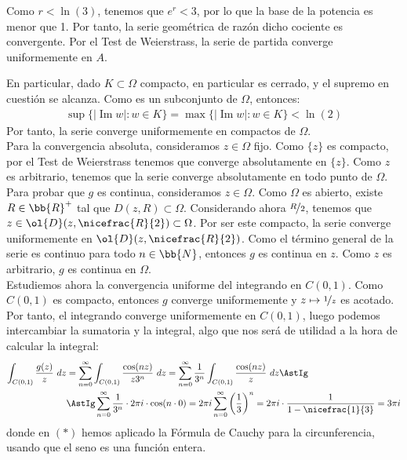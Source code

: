 \documentclass[12pt]{article}
\renewcommand{\Im}{\operatorname{Im}}
\begin{document}
\begin{ejercicio}[4 puntos]
\begin{description}
            Como $r<\ln(3)$, tenemos que $e^{r}<3$, por lo que la base de la potencia es menor que 1. Por tanto, la serie geométrica de razón dicho cociente es convergente. Por el Test de Weierstrass, la serie de partida converge uniformemente en $A$.
        \end{description}

        En particular, dado $K\subset \Omega$ compacto, en particular es cerrado, y el supremo en cuestión se alcanza. Como es un subconjunto de $\Omega$, entonces:
        \begin{align*}
            \sup\{|\Im w| : w\in K\}=\max\{|\Im w| : w\in K\} < \ln(2)
        \end{align*}
        Por tanto, la serie converge uniformemente en compactos de $\Omega$.\\

        Para la convergencia absoluta, consideramos $z\in \Omega$ fijo. Como $\{z\}$ es compacto, por el Test de Weierstrass tenemos que converge absolutamente en $\{z\}$. Como $z$ es arbitrario, tenemos que la serie converge absolutamente en todo punto de $\Omega$.\\

        Para probar que $g$ es continua, consideramos $z\in \Omega$. Como $\Omega$ es abierto, existe $R\in \bb{R}^+$ tal que $D(z,R)\subset \Omega$. Considerando ahora $\nicefrac{R}{2}$, tenemos que $z\in \ol{D}(z,\nicefrac{R}{2})\subset \Omega$. Por ser este compacto, la serie converge uniformemente en $\ol{D}(z,\nicefrac{R}{2})$. Como el término general de la serie es continuo para todo $n\in \bb{N}$, entonces $g$ es continua en $z$. Como $z$ es arbitrario, $g$ es continua en $\Omega$.\\

        Estudiemos ahora la convergencia uniforme del integrando en $C(0,1)$. Como $C(0,1)$ es compacto, entonces $g$ converge uniformemente y $z\mapsto \nicefrac{1}{z}$ es acotado. Por tanto, el integrando converge uniformemente en $C(0,1)$, luego podemos intercambiar la sumatoria y la integral, algo que nos será de utilidad a la hora de calcular la integral:
        \begin{align*}
            \int_{C(0,1)} \frac{g(z)}{z}\ dz &= \sum_{n=0}^{\infty} \int_{C(0,1)} \frac{\cos(nz)}{z3^n}\ dz
            = \sum_{n=0}^{\infty} \frac{1}{3^n}\int_{C(0,1)} \frac{\cos(nz)}{z}\ dz \AstIg\\&\AstIg \sum_{n=0}^{\infty} \frac{1}{3^n}\cdot 2\pi i \cdot \cos (n\cdot 0) = 2\pi i\sum_{n=0}^{\infty} \left(\dfrac{1}{3}\right)^n = 2\pi i \cdot \dfrac{1}{1-\nicefrac{1}{3}} = 3\pi i
        \end{align*}
        donde en $(\ast)$ hemos aplicado la Fórmula de Cauchy para la circunferencia, usando que el seno es una función entera.
    \end{ejercicio}
\end{document}
